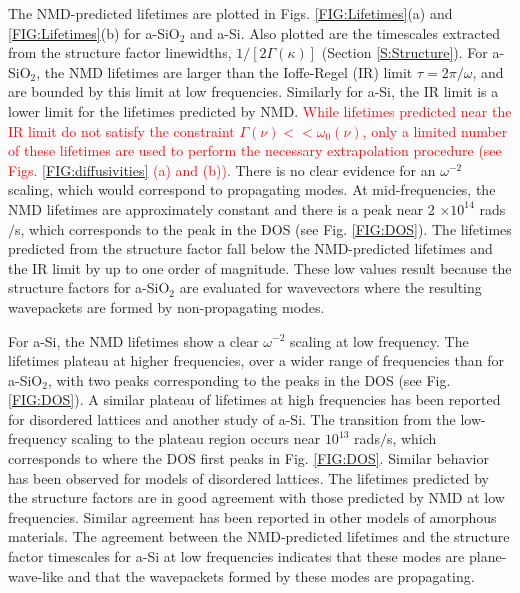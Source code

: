 \documentclass[aps,prb,onecolumn,preprint,superscriptaddress,footinbib,amsmath,amssymb,floatfix]{revtex4}
\begin{document}
The NMD-predicted lifetimes are plotted in Figs. 
\ref{FIG:Lifetimes}(a) and \ref{FIG:Lifetimes}(b) 
for a-SiO$_2$ and a-Si. 
Also plotted are the timescales extracted from the structure 
factor linewidths, $1/[2\Gamma(\kappa)]$ (Section \ref{S:Structure}). 
For a-SiO$_2$, the NMD lifetimes are larger than 
the Ioffe-Regel (IR) limit $\tau = 2\pi/\omega$,
\cite{taraskin_determination_1999} and are bounded by  
this limit at low frequencies. Similarly for a-Si, the IR limit is 
a lower limit for the lifetimes predicted by NMD. 
\textcolor{red}{
While lifetimes 
predicted near the IR limit do not satisfy the constraint 
$\Gamma(\nu) << \omega_0(\nu)$, only a limited number of these 
lifetimes are used to perform the necessary extrapolation procedure 
(see Figs. \ref{FIG:diffusivities} (a) and (b)). 
}
There is no clear evidence for an 
$\omega^{-2}$ scaling, which would correspond to propagating modes.  
At mid-frequencies, the NMD lifetimes are approximately constant and  
there is a peak near 2 $\times 10^{14}$ rads$/$s, which corresponds to 
the peak in the DOS (see Fig. \ref{FIG:DOS}). 
The lifetimes predicted from the 
structure factor fall below the NMD-predicted lifetimes 
and the IR limit by up to one order of magnitude. 
These low values result because the structure factors 
for a-SiO$_2$ are evaluated for wavevectors where the resulting 
wavepackets are formed by non-propagating modes.
\cite{feldman_thermal_1993,feldman_numerical_1999,allen_diffusons_1999}

For a-Si, the NMD lifetimes show a clear $\omega^{-2}$ 
scaling at low frequency. 
The lifetimes plateau at higher frequencies,
over a wider range of frequencies than for a-SiO$_2$, with two peaks 
corresponding to the peaks in the DOS (see Fig. \ref{FIG:DOS}). 
A similar plateau of lifetimes at high frequencies has been 
reported for disordered lattices
\cite{sheng_heat_1991,he_lattice_2012,larkin_predicting_2013} and 
another study of a-Si.\cite{he_heat_2011} 
The transition from the low-frequency scaling to 
the plateau region occurs near 
$10^{13}$ rads$/$s, which corresponds to where the DOS first peaks 
in Fig. \ref{FIG:DOS}. 
Similar behavior has been observed for models of disordered lattices.
\cite{larkin_predicting_2013} The lifetimes predicted by the 
structure factors are in good agreement with those predicted by NMD 
at low frequencies. Similar agreement has been reported in other 
models of amorphous materials.
\cite{mazzacurati_low-frequency_1996,bickham_calculation_1998,
bickham_numerical_1999,feldman_numerical_1999} 
The agreement between the 
NMD-predicted lifetimes and the structure factor timescales for a-Si 
at low frequencies indicates that these modes are plane-wave-like 
and that the wavepackets formed by these modes are propagating.
\cite{feldman_thermal_1993,feldman_numerical_1999,allen_diffusons_1999}
\end{document}
